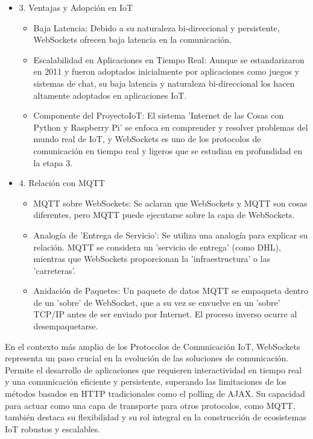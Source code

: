 \documentclass{report}
\begin{document}
\begin{itemize}
    \item 3. Ventajas y Adopción en IoT
    \begin{itemize}
        \item Baja Latencia: Debido a su naturaleza bi-direccional y persistente, WebSockets ofrecen  baja latencia en 
        la comunicación.
        \item Escalabilidad en Aplicaciones en Tiempo Real: Aunque se estandarizaron en 2011 y fueron adoptados inicialmente 
        por aplicaciones como juegos y sistemas de chat, su baja latencia y naturaleza bi-direccional los hacen altamente adoptados 
        en aplicaciones IoT.
        \item Componente del ProyectoIoT: El sistema 'Internet de las Cosas con Python y Raspberry Pi' se enfoca en comprender 
        y resolver problemas del mundo real de IoT, y WebSockets es uno de los protocolos de comunicación en tiempo real y ligeros 
        que se estudian en profundidad en la etapa 3.
    \end{itemize}

    \item 4. Relación con MQTT
    \begin{itemize}
        \item MQTT sobre WebSockets: Se aclaran que WebSockets y MQTT son cosas diferentes, pero MQTT puede ejecutarse 
        sobre la capa de WebSockets.
        \item Analogía de 'Entrega de Servicio': Se utiliza una analogía para explicar su relación. MQTT se considera un 
        'servicio de entrega' (como DHL), mientras que  WebSockets proporcionan la 'infraestructura' o las 'carreteras'.
        \item Anidación de Paquetes: Un paquete de datos MQTT se empaqueta dentro de un 'sobre' de WebSocket, que a su vez 
        se envuelve en un 'sobre' TCP/IP antes de ser enviado por Internet. El proceso inverso ocurre al desempaquetarse.
    \end{itemize}
\end{itemize}
En el contexto más amplio de los Protocolos de Comunicación IoT, WebSockets representa un paso crucial en la evolución 
de las soluciones de comunicación. Permite el desarrollo de aplicaciones que requieren interactividad en tiempo real y 
una comunicación eficiente y persistente, superando las limitaciones de los métodos basados en HTTP tradicionales como 
el polling de AJAX. Su capacidad para actuar como una capa de transporte para otros protocolos, como MQTT, también destaca 
su flexibilidad y su rol integral en la construcción de ecosistemas IoT robustos y escalables.
\end{document}
